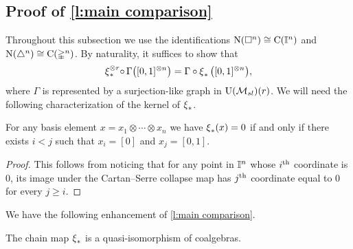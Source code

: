 \subsection{Proof of \cref{l:main comparison}} \label{ss:comparison proof}

Throughout this subsection we use the identifications $\operatorname{N}(\square^n) \cong \operatorname{C}(\mathbb{I}^n)$ and $\operatorname{N}(\triangle^n) \cong \operatorname{C}(\mathbb{\Delta}^n)$.
By naturality, it suffices to show that
\begin{equation} \label{e:Cartan--Serre E-coalgebra map}
\operatorname{\xi}_\ast^{\otimes r} \! \circ \, \Gamma \big( [0,1]^{\otimes n} \big) =
\Gamma \circ \operatorname{\xi}_\ast \big( [0,1]^{\otimes n} \big),
\end{equation}
where $\Gamma$ is represented by a surjection-like graph in ${\operatorname{U}(\mathcal{M}_{sl})}(r)$.
We will need the following characterization of the kernel of $\operatorname{\xi}_\ast$.
\begin{lemma} \label{l:kernel of psi}
	For any basis element $x = x_1 \otimes \cdots \otimes x_n$ we have $\operatorname{\xi}_\ast(x) = 0$ if and only if there exists $i < j$ such that $x_i = [0]$ and $x_j = [0,1]$.
\end{lemma}

\begin{proof}
	This follows from noticing that for any point in $\mathbb{I}^n$ whose $i^{\mathrm{th}}$ coordinate is $0$, its image under the Cartan--Serre collapse map has $j^{\mathrm{th}}$ coordinate equal to $0$ for every $j \geq i$.
\end{proof}

We have the following enhancement of \cref{l:main comparison}.

\begin{lemma}
	The chain map $\operatorname{\xi}_\ast$ is a quasi-isomorphism of coalgebras.
\end{lemma}

